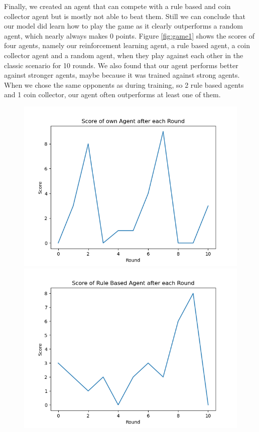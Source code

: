 Finally, we created an agent that can compete with a rule based and coin collector agent but is mostly not able to beat them. Still we can conclude that our model did learn how to play the game as it clearly outperforms a random agent, which nearly always makes 0 points. Figure \ref{fig:game1} shows the scores of four agents, namely our reinforcement learning agent, a rule based agent, a coin collector agent and a random agent, when they play against each other in the classic scenario for 10 rounds. We also found that our agent performs better against stronger agents, maybe because it was trained against strong agents. When we chose the same opponents as during training, so 2 rule based agents and 1 coin collector, our agent often outperforms at least one of them.
\begin{figure}[H]
    \centering
    \begin{minipage}{0.49\textwidth}
		\centering
		\includegraphics[scale=0.52]{images/my_scores11_1.png}
    \end{minipage}
    \begin{minipage}{0.49\textwidth}
	\centering
		\includegraphics[scale=0.52]{images/rule_scores11_1.png}

\end{minipage}
\end{figure}
